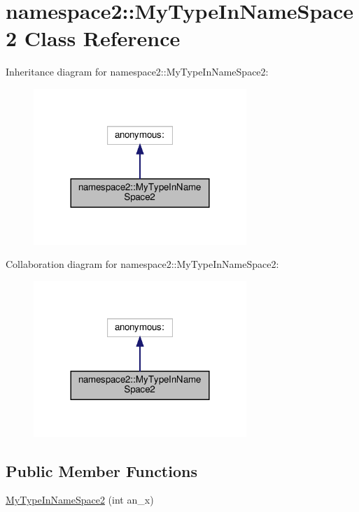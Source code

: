 \hypertarget{classnamespace2_1_1_my_type_in_name_space2}{}\section{namespace2\+:\+:My\+Type\+In\+Name\+Space2 Class Reference}
\label{classnamespace2_1_1_my_type_in_name_space2}


Inheritance diagram for namespace2\+:\+:My\+Type\+In\+Name\+Space2\+:
\nopagebreak
\begin{figure}[H]
\begin{center}
\leavevmode
\includegraphics[width=228pt]{classnamespace2_1_1_my_type_in_name_space2__inherit__graph}
\end{center}
\end{figure}


Collaboration diagram for namespace2\+:\+:My\+Type\+In\+Name\+Space2\+:
\nopagebreak
\begin{figure}[H]
\begin{center}
\leavevmode
\includegraphics[width=228pt]{classnamespace2_1_1_my_type_in_name_space2__coll__graph}
\end{center}
\end{figure}
\subsection*{Public Member Functions}
\begin{DoxyCompactItemize}
\item 
\hyperlink{classnamespace2_1_1_my_type_in_name_space2_a033025628289dbf29022b2bfbe66f53e}{My\+Type\+In\+Name\+Space2} (int an\+\_\+x)
\end{DoxyCompactItemize}



